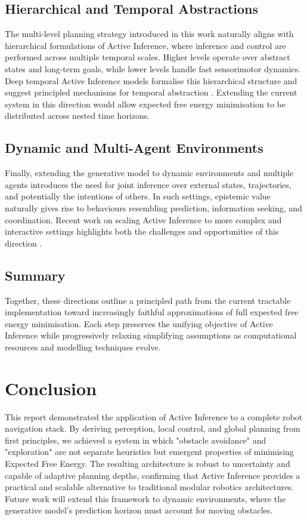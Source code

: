 \documentclass[a4paper, twoside]{article}
\begin{document}
\subsection{Hierarchical and Temporal Abstractions}

The multi-level planning strategy introduced in this work naturally aligns with hierarchical formulations of Active Inference, where inference and control are performed across multiple temporal scales. Higher levels operate over abstract states and long-term goals, while lower levels handle fast sensorimotor dynamics. Deep temporal Active Inference models formalise this hierarchical structure and suggest principled mechanisms for temporal abstraction \cite{friston2017deep}. Extending the current system in this direction would allow expected free energy minimisation to be distributed across nested time horizons.

\subsection{Dynamic and Multi-Agent Environments}

Finally, extending the generative model to dynamic environments and multiple agents introduces the need for joint inference over external states, trajectories, and potentially the intentions of others. In such settings, epistemic value naturally gives rise to behaviours resembling prediction, information seeking, and coordination. Recent work on scaling Active Inference to more complex and interactive settings highlights both the challenges and opportunities of this direction \cite{tschantz2020scaling}.

\subsection{Summary}

Together, these directions outline a principled path from the current tractable implementation toward increasingly faithful approximations of full expected free energy minimisation. Each step preserves the unifying objective of Active Inference while progressively relaxing simplifying assumptions as computational resources and modelling techniques evolve.



\section{Conclusion}
This report demonstrated the application of Active Inference to a complete robot navigation stack. By deriving perception, local control, and global planning from first principles, we achieved a system in which "obstacle avoidance" and "exploration" are not separate heuristics but emergent properties of minimising Expected Free Energy. The resulting architecture is robust to uncertainty and capable of adaptive planning depths, confirming that Active Inference provides a practical and scalable alternative to traditional modular robotics architectures. Future work will extend this framework to dynamic environments, where the generative model's prediction horizon must account for moving obstacles.
\end{document}
